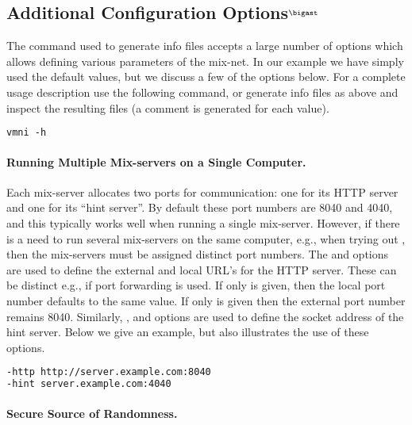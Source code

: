\documentclass[11pt]{article}
\newcommand{\MARK}{$^\bigast$}
\begin{document}
\subsection{Additional Configuration Options\MARK}\label{sect:configure}

The command \vmni{} used to generate info files accepts a large number
of options which allows defining various parameters of the mix-net. In
our example we have simply used the default values, but we discuss a
few of the options below. For a complete usage description use the
following command, or generate info files as above and inspect the
resulting files (a comment is generated for each value).

\vspace{0.3cm}
\begin{lstlisting}[frame=single,language=xml,
basicstyle=\tt,showstringspaces=false]
vmni -h
\end{lstlisting}

\paragraph{Running Multiple Mix-servers on a Single Computer.}

Each mix-server allocates two ports for communication: one for its
HTTP server and one for its ``hint server''. By default these port
numbers are 8040 and 4040, and this typically works well when running
a single mix-server. However, if there is a need to run several
mix-servers on the same computer, e.g., when trying out \veri, then
the mix-servers must be assigned distinct port numbers. The
 and  options are used to define the external
and local URL's for the HTTP server. These can be distinct e.g., if
port forwarding is used. If only  is given, then the local
port number defaults to the same value. If only  is given
then the external port number remains 8040. Similarly, ,
and  options are used to define the socket address of the
hint server. Below we give an example, but  also
illustrates the use of these options.

\vspace{0.3cm}
\begin{lstlisting}[frame=single,language=xml,
basicstyle=\tt,showstringspaces=false]
-http http://server.example.com:8040
-hint server.example.com:4040
\end{lstlisting}

\paragraph{Secure Source of Randomness.}
\end{document}
